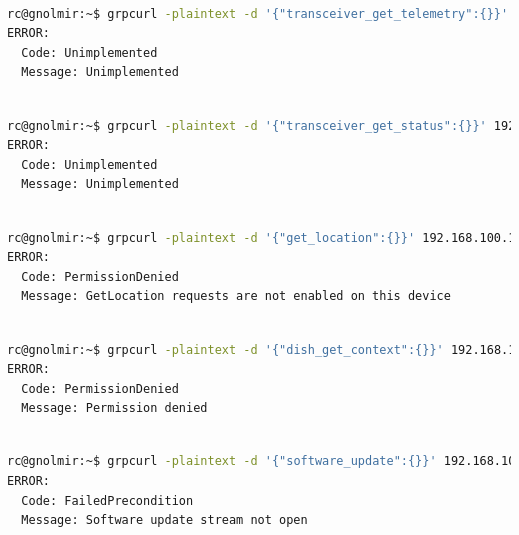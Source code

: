 \documentclass[IN,11pt,twoside,openright,idp,english]{tumthesis}
\begin{document}
\begin{lstlisting}[language=bash,basicstyle=\tiny]

rc@gnolmir:~$ grpcurl -plaintext -d '{"transceiver_get_telemetry":{}}' 192.168.100.1:9200 SpaceX.API.Device.Device/Handle
ERROR:
  Code: Unimplemented
  Message: Unimplemented
\end{lstlisting}
\begin{lstlisting}[language=bash,basicstyle=\tiny]

rc@gnolmir:~$ grpcurl -plaintext -d '{"transceiver_get_status":{}}' 192.168.100.1:9200 SpaceX.API.Device.Device/Handle
ERROR:
  Code: Unimplemented
  Message: Unimplemented
\end{lstlisting}
\begin{lstlisting}[language=bash,basicstyle=\tiny]

rc@gnolmir:~$ grpcurl -plaintext -d '{"get_location":{}}' 192.168.100.1:9200 SpaceX.API.Device.Device/Handle
ERROR:
  Code: PermissionDenied
  Message: GetLocation requests are not enabled on this device
\end{lstlisting}
\begin{lstlisting}[language=bash,basicstyle=\tiny]

rc@gnolmir:~$ grpcurl -plaintext -d '{"dish_get_context":{}}' 192.168.100.1:9200 SpaceX.API.Device.Device/Handle
ERROR:
  Code: PermissionDenied
  Message: Permission denied
\end{lstlisting}
\begin{lstlisting}[language=bash,basicstyle=\tiny]

rc@gnolmir:~$ grpcurl -plaintext -d '{"software_update":{}}' 192.168.100.1:9200 SpaceX.API.Device.Device/Handle
ERROR:
  Code: FailedPrecondition
  Message: Software update stream not open
\end{lstlisting}
\end{document}
